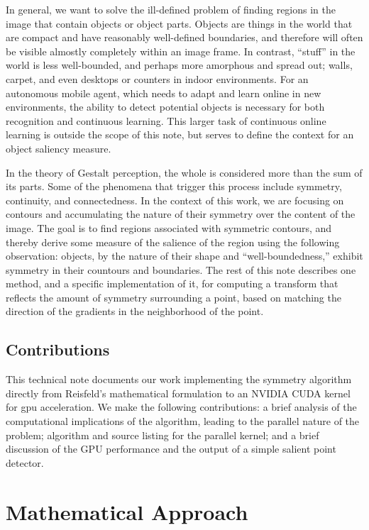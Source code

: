 In general, we want to solve the ill-defined problem of finding regions in the image that contain objects or object parts. Objects are things in the world that are compact and have reasonably well-defined boundaries, and therefore will often be visible almostly completely within an image frame. In contrast, ``stuff'' in the world is less well-bounded, and perhaps more amorphous and spread out; \eg walls, carpet, and even desktops or counters in indoor environments. For an autonomous mobile agent, which needs to adapt and learn online in new environments, the ability to detect potential objects is necessary for both recognition and continuous learning. This larger task of continuous online learning is outside the scope of this note, but serves to define the context for an object saliency measure.

In the theory of Gestalt perception, the whole is considered more than the sum of its parts\cite{jakel_overview_2016}. Some of the phenomena that trigger this process include symmetry, continuity, and connectedness. In the context of this work, we are focusing on contours and accumulating the nature of their symmetry over the content of the image. The goal is to find regions associated with symmetric contours, and thereby derive some measure of the salience of the region using the following observation: objects, by the nature of their shape and ``well-boundedness,'' exhibit symmetry in their countours and boundaries. The rest of this note describes one method, and a specific implementation of it, for computing a transform that reflects the amount of symmetry surrounding a point, based on matching the direction of the gradients in the neighborhood of the point. 

\subsection{Contributions}
\label{sec:contributions}

This technical note documents our work implementing the symmetry algorithm directly from Reisfeld's mathematical formulation to an NVIDIA CUDA kernel for \gls{gpu} acceleration. We make the following contributions: a brief analysis of the computational implications of the algorithm, leading to the parallel nature of the problem; algorithm and source listing for the parallel kernel; and a brief discussion of the GPU performance and the output of a simple salient point detector. 

\section{Mathematical Approach}
\label{sec:mathematical}

